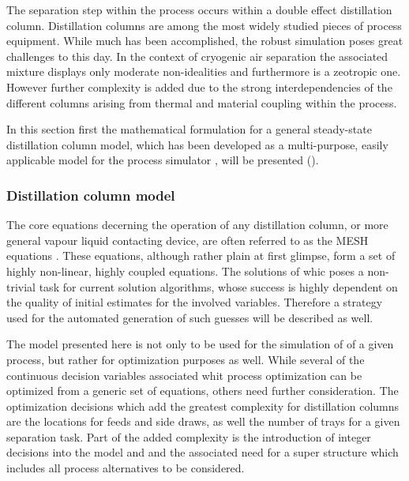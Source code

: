     The separation step within the process occurs within a double effect distillation column. 
    Distillation columns are among the most widely studied pieces of process equipment. While much has been
    accomplished, the robust simulation poses great challenges to this day. In the context of cryogenic
    air separation the associated mixture displays only moderate non-idealities and furthermore is
    a zeotropic one. However further complexity is added due to the strong interdependencies of the different
    columns arising from thermal and material coupling within the process.

    In this section first the mathematical formulation for a general steady-state distillation column model, 
    which has been developed as a multi-purpose, easily applicable model for the process simulator \gproms, 
    will be presented (). 

    \subsubsection{Distillation column model}
    \label{sec:mathpro:steady:distmodel}

        The core equations decerning the operation of any distillation column, or more general vapour liquid contacting 
        device, are often referred to as the MESH equations . These equations, although 
        rather plain at first glimpse, form a set of highly non-linear, highly coupled equations. The solutions of whic 
        poses a non-trivial task for current solution algorithms, whose success is highly dependent on the quality of 
        initial estimates for the involved variables. Therefore a strategy used for the automated generation of such 
        guesses will be described as well.

        The model presented here is not only to be used for the simulation of of a given process, but rather
        for optimization purposes as well. While several of the continuous decision variables associated
        whit process optimization can be optimized from a generic set of equations, others need further consideration.
        The optimization decisions which add the greatest complexity for distillation columns are the locations for feeds
        and side draws, as well the number of trays for a given separation task. Part of the added complexity is 
        the introduction of integer decisions into the model and and the associated need for a super structure which 
        includes all process alternatives to be considered.

